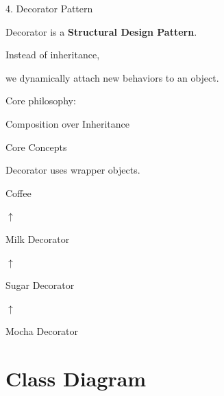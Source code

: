 \documentclass[aspectratio=169]{beamer}
\begin{document}
\begin{frame}{4. Decorator Pattern}

Decorator is a \textbf{Structural Design Pattern}.

\bigskip

Instead of inheritance,

we dynamically attach new behaviors to an object.

\bigskip

Core philosophy:

\begin{center}

\Huge
Composition over Inheritance

\end{center}
\end{frame}


\begin{frame}{Core Concepts}

Decorator uses wrapper objects.

\bigskip

\begin{center}

Coffee

$\uparrow$

Milk Decorator

$\uparrow$

Sugar Decorator

$\uparrow$

Mocha Decorator

\end{center}
\end{frame}

\section{Class Diagram}
\end{document}
